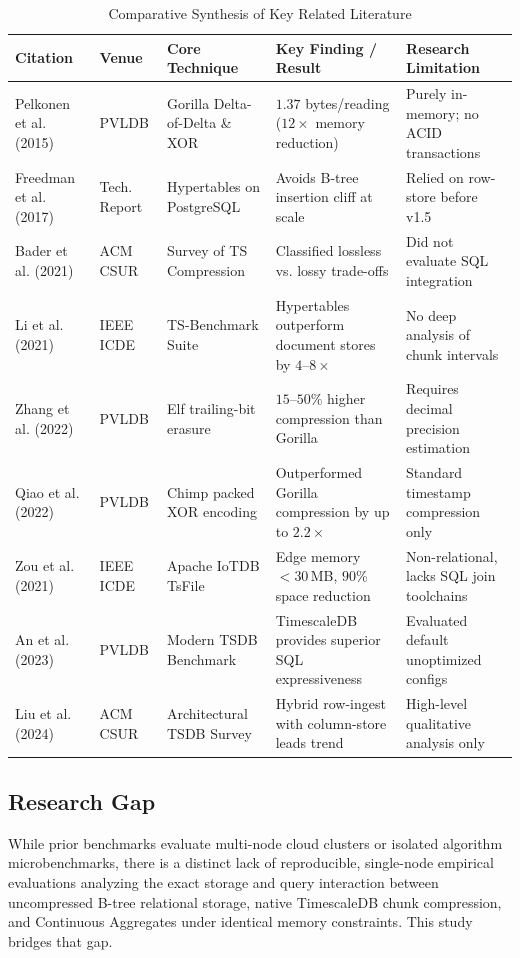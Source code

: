 \documentclass[conference,a4paper]{IEEEtran}
\begin{document}
\begin{table}[t]
\centering
\caption{Comparative Synthesis of Key Related Literature}
\label{tab:lit_matrix}
\footnotesize
\begin{tabular}{@{}p{2.8cm}p{1.8cm}p{3.8cm}p{4.2cm}p{3.8cm}@{}}
\toprule
\textbf{Citation} & \textbf{Venue} & \textbf{Core Technique} & \textbf{Key Finding / Result} & \textbf{Research Limitation} \\
\midrule
Pelkonen et al. (2015) \cite{pelkonen2015gorilla} & PVLDB & Gorilla Delta-of-Delta \& XOR & $1.37$ bytes/reading ($12\times$ memory reduction) & Purely in-memory; no ACID transactions \\
Freedman et al. (2017) \cite{freedman2017timescaledb} & Tech. Report & Hypertables on PostgreSQL & Avoids B-tree insertion cliff at scale & Relied on row-store before v1.5 \\
Bader et al. (2021) \cite{bader2021survey} & ACM CSUR & Survey of TS Compression & Classified lossless vs. lossy trade-offs & Did not evaluate SQL integration \\
Li et al. (2021) \cite{li2021tsbenchmark} & IEEE ICDE & TS-Benchmark Suite & Hypertables outperform document stores by $4\text{--}8\times$ & No deep analysis of chunk intervals \\
Zhang et al. (2022) \cite{zhang2022elf} & PVLDB & Elf trailing-bit erasure & $15\text{--}50\%$ higher compression than Gorilla & Requires decimal precision estimation \\
Qiao et al. (2022) \cite{qiao2022chimp} & PVLDB & Chimp packed XOR encoding & Outperformed Gorilla compression by up to $2.2\times$ & Standard timestamp compression only \\
Zou et al. (2021) \cite{zou2021iotdb} & IEEE ICDE & Apache IoTDB TsFile & Edge memory $<30$\,MB, $90\%$ space reduction & Non-relational, lacks SQL join toolchains \\
An et al. (2023) \cite{an2023benchmarking} & PVLDB & Modern TSDB Benchmark & TimescaleDB provides superior SQL expressiveness & Evaluated default unoptimized configs \\
Liu et al. (2024) \cite{liu2024comprehensive} & ACM CSUR & Architectural TSDB Survey & Hybrid row-ingest with column-store leads trend & High-level qualitative analysis only \\
\bottomrule
\end{tabular}
\end{table}

\subsection{Research Gap}
While prior benchmarks evaluate multi-node cloud clusters or isolated algorithm microbenchmarks, there is a distinct lack of reproducible, single-node empirical evaluations analyzing the exact storage and query interaction between uncompressed B-tree relational storage, native TimescaleDB chunk compression, and Continuous Aggregates under identical memory constraints. This study bridges that gap.
\end{document}
